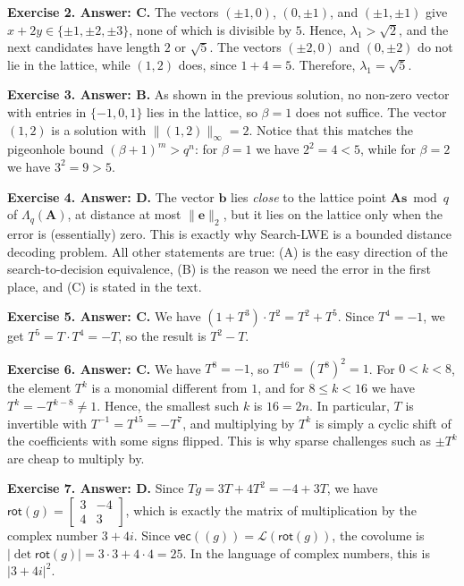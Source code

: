 \documentclass[../../book]{subfiles}
\begin{document}
 
\textbf{Exercise 2. Answer: C.} The vectors $(\pm 1, 0)$, $(0, \pm 1)$, and $(\pm 1, \pm 1)$ give $x + 2y \in \{\pm 1, \pm 2, \pm 3\}$, none of which is divisible by $5$.
Hence, $\lambda_1 > \sqrt{2}$, and the next candidates have length $2$ or $\sqrt{5}$.
The vectors $(\pm 2, 0)$ and $(0,\pm 2)$ do not lie in the lattice, while $(1,2)$ does, since $1 + 4 = 5$.
Therefore, $\lambda_1 = \sqrt{5}$.
 
 
\textbf{Exercise 3. Answer: B.} As shown in the previous solution, no non-zero vector with entries in $\{-1,0,1\}$ lies in the lattice, so $\beta = 1$ does not suffice.
The vector $(1,2)$ is a solution with $\|(1,2)\|_{\infty} = 2$.
Notice that this matches the pigeonhole bound $(\beta+1)^m > q^n$: for $\beta = 1$ we have $2^2 = 4 < 5$, while for $\beta = 2$ we have $3^2 = 9 > 5$.
 
 
\textbf{Exercise 4. Answer: D.} The vector $\mathbf{b}$ lies \emph{close} to the lattice point $\mathbf{A}\mathbf{s} \bmod q$ of $\Lambda_q(\mathbf{A})$, at distance at most $\|\mathbf{e}\|_2$, but it lies on the lattice only when the error is (essentially) zero.
This is exactly why Search-LWE is a bounded distance decoding problem.
All other statements are true: (A) is the easy direction of the search-to-decision equivalence, (B) is the reason we need the error in the first place, and (C) is stated in the text.
 
 
\textbf{Exercise 5. Answer: C.} We have $(1+T^3) \cdot T^2 = T^2 + T^5$.
Since $T^4 = -1$, we get $T^5 = T \cdot T^4 = -T$, so the result is $T^2 - T$.
 
 
\textbf{Exercise 6. Answer: C.} We have $T^8 = -1$, so $T^{16} = (T^8)^2 = 1$.
For $0 < k < 8$, the element $T^k$ is a monomial different from $1$, and for $8 \leq k < 16$ we have $T^k = -T^{k-8} \neq 1$.
Hence, the smallest such $k$ is $16 = 2n$.
In particular, $T$ is invertible with $T^{-1} = T^{15} = -T^7$, and multiplying by $T^k$ is simply a cyclic shift of the coefficients with some signs flipped.
This is why sparse challenges such as $\pm T^k$ are cheap to multiply by.
 
 
\textbf{Exercise 7. Answer: D.} Since $Tg = 3T + 4T^2 = -4 + 3T$, we have $\mathsf{rot}(g) = \begin{bmatrix} 3 & -4 \\ 4 & 3 \end{bmatrix}$, which is exactly the matrix of multiplication by the complex number $3+4i$.
Since $\mathsf{vec}((g)) = \mathcal{L}(\mathsf{rot}(g))$, the covolume is $|\det \mathsf{rot}(g)| = 3 \cdot 3 + 4 \cdot 4 = 25$.
In the language of complex numbers, this is $|3+4i|^2$.
 
\end{document}
